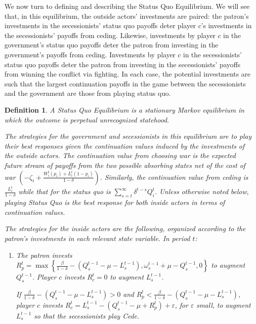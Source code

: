 \documentclass[11pt,letterpaper, notitlepage]{article}
\newtheorem{definition}{Definition}
\newcommand{\de}{\delta}
\newcommand{\ve}{\varepsilon}
\begin{document}
We now turn to defining and describing the Status Quo Equilibrium. We will see that, in this equilibrium, the outside actors' investments are paired: the patron's investments in the secessionists' status quo payoffs deter player $c$'s investments in the secessionists' payoffs from ceding. Likewise, investments by player $c$ in the government's status quo payoffs deter the patron from investing in the government's payoffs from ceding. Investments by player $c$ in the secessionists' status quo payoffs deter the patron from investing in the secessionists' payoffs from winning the conflict via fighting. In each case, the potential  investments are such that the largest continuation payoffs in the game between the secessionists and the government are those from playing status quo.

\begin{definition}
A Status Quo Equilibrium is a stationary Markov equilibrium in which the outcome is perpetual unrecognized statehood.

The strategies for the government and secessionists in this equilibrium are to play their best responses given the continuation values induced by the investments of the outside actors. The continuation value from choosing war is the expected future stream of payoffs from the two possible absorbing states net of the cost of war $\left(-\zeta_i +\frac{W_i^t(p_i)+ L_i^t(1-p_i)}{1-\delta}\right)$. Similarly, the continuation value from ceding is $\frac{L_i^t}{1-\de}$ while that for the status quo is $\sum_{s=t}^\infty \de^{t-s} Q_i^t$. Unless otherwise noted below, playing Status Quo is the best response for both inside actors in terms of continuation values.

The strategies for the inside actors are the following, organized according to the patron's investments in each relevant state variable. In period $t$:

\begin{enumerate}
	\item The patron invests $R_p^t = \max\left\{\frac{\beta}{1-\de} - \left( Q_s^{t-1} - \mu - L_s^{t-1}\right),\omega_s^{t-1} +\mu - Q_s^{t-1},0\right\}$ to augment $Q_s^{t-1}$. Player $c$ invests $R_c^t =0$ to augment $L_s^{t-1}$.

If $\frac{\beta}{1-\de} - \left( Q_s^{t-1} - \mu - L_s^{t-1}\right) > 0$ and $R_p^t < \frac{\beta}{1-\de} - \left( Q_s^{t-1} - \mu - L_s^{t-1}\right)$, player $c$ invests $R_c^t = L_s^{t-1} - \left(Q_s^{t-1} - \mu + R_p^t \right) + \ve$, for $\ve$ small, to augment $L_s^{t-1}$ so that the secessionists play Cede.


\end{enumerate}
\end{definition}
\end{document}

